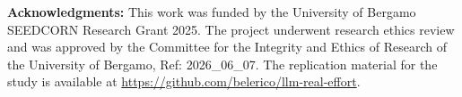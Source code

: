 \documentclass[12pt,a4paper]{article}
\newcommand{\red}[1]{\textcolor{red}{#1}}
\newcommand{\blue}[1]{\textcolor{blue}{#1}}
\begin{document}

\vspace{1cm}

{\bf Acknowledgments:} This work was funded by the University of Bergamo SEEDCORN Research Grant 2025. The project underwent research ethics review and was approved by the Committee for the Integrity and Ethics of Research
of the University of Bergamo, Ref: 2026\_06\_07. The replication material for the study is available at \url{https://github.com/belerico/llm-real-effort}.

\newpage




\clearpage
\end{document}
